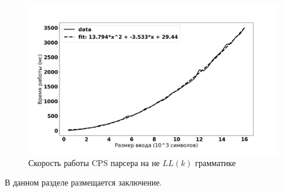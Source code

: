 \documentclass[times]{itmo-student-thesis}
\begin{document}
\begin{figure}[!h]
  \caption{Скорость работы CPS парсера на не $LL(k)$ грамматике}\label{fig:notllk_plot}
  \includegraphics[width=0.8\paperwidth]{./images/notllk_memo.png}
\end{figure}

\startconclusionpage

В данном разделе размещается заключение.

\printmainbibliography
\end{document}

